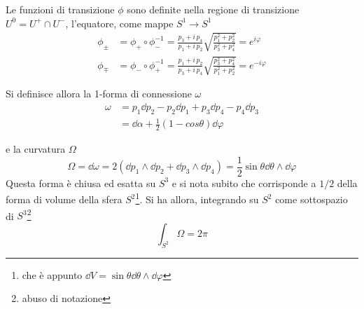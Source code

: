 Le funzioni di transizione $\phi $ sono definite nella regione di transizione
$U^0 = U^+ \cap U^-$, l'equatore, come mappe $S^1 \to S^1$
\begin{equation}
   \begin{aligned}
  \phi _\pm & = \phi _+ \circ \phi _- ^{-1}
             = \frac{p_3 +  i \, p_4}{p_1 + i \, p_2}
                \sqrt{ \frac{p_1^2 + p_2^2}{p_3^2 + p_4^2} }
             = e^{i\varphi } \\
  \phi _\mp & = \phi _- \circ \phi _+ ^{-1}
             = \frac{p_1 + i \, p_2}{p_3 +  i \, p_4}
                  \sqrt{ \frac{p_3^2 + p_4^2}{p_1^2 + p_2^2}}
             = e^{-i\varphi }
   \end{aligned}
\end{equation}


Si definisce allora la 1-forma di connessione $\omega$
\begin{equation}
   \begin{aligned}
      \omega & = p_1 \dd  p_2 - p_2 \dd  p_1 + p_3 \dd  p_4 - p_4 \dd  p_3 \\
             & = \dd \alpha + \frac{1}{2}(1 - cos\theta) \dd  \varphi
   \end{aligned}
\end{equation}

e la curvatura $\Omega$
$$
   \Omega = \dd  \omega = 2 ( \dd  p_1 \wedge \dd  p_2 + \dd  p_3 \wedge \dd  p_4)
          = \frac{1}{2} \sin\theta \dd \theta \wedge \dd \varphi
$$
Questa forma è chiusa ed esatta su $S^3$ e si nota subito che corrisponde a $1/2$
della forma di volume della sfera $S^2$\footnote{
   che è appunto $\dd V = \sin\theta \dd \theta \wedge \dd \varphi $}.
Si ha allora, integrando su $S^2$ come sottospazio di $S^3$\footnote{
   abuso di notazione}
$$
   \int_{S^2} \Omega = 2\pi
$$

